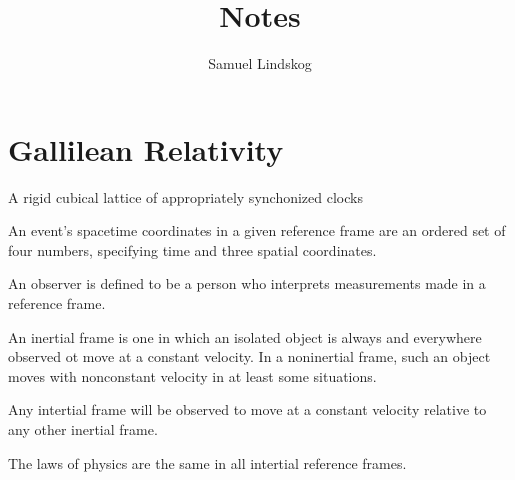 \documentclass{article}
\title{Notes}
\author{Samuel Lindskog}
\begin{document}
\maketitle
{}
\tableofcontents
{}
\clearpage
{}
\setcounter{page}{1}

\section{Gallilean Relativity}
\begin{definition}
	A rigid cubical lattice of appropriately synchonized clocks
\end{definition}
\begin{definition}
	An event's spacetime coordinates in a given reference frame are an ordered set of four numbers, specifying time and three spatial coordinates.
\end{definition}
\begin{definition}[Observer]
	An observer is defined to be a person who interprets measurements made in a reference frame.
\end{definition}
\begin{definition}
	An inertial frame is one in which an isolated object is always and everywhere observed ot move at a constant velocity. In a noninertial frame, such an object moves with nonconstant velocity in at least some situations.
\end{definition}
\begin{proposition}
	Any intertial frame will be observed to move at a constant velocity relative to any other inertial frame.
\end{proposition}
\begin{definition}
	The laws of physics are the same in all intertial reference frames.
\end{definition}
\end{document}
